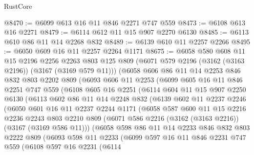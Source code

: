 \begin{lexlean}{RustCore}
\begin{coremodule}
@8470 := @6099 @613 @16 @11 @846 @2271 @747 @559
@8473 := @6108 @613 @16 @2271
@8479 := @6114 @612 @11 @15 @907 @2270 @6130
@8485 := @6113 @610 @86 @11 @14 @2268 @832
@8489 := @6139 @610 @11 @2257 @2266
@8495 := @6050 @609 @16 @11 @2257 @2264 @1171
@8675 := @6058
    @580
    @608
    @11
    @15
    @2196
    @2256
    @2263
    @803
    @125
    @809
    (@6071 @579 @2196 (@3162 (@3163 @2196)) (@3167 (@3169 @579 @11)))
    (@6058
      @606
      @86
      @11
      @14
      @2253
      @846
      @832
      @803
      @2202
      @809
      (@6093
        @606
        @11
        @2253
        (@6099
          @605
          @16
          @11
          @846
          @2251
          @747
          @559
          (@6108
            @605
            @16
            @2251
            (@6114
              @604
              @11
              @15
              @907
              @2250
              @6130
              (@6113
                @602
                @86
                @11
                @14
                @2248
                @832
                (@6139
                  @602
                  @11
                  @2237
                  @2246
                  (@6050
                    @601
                    @16
                    @11
                    @2237
                    @2244
                    @1171
                    (@6058
                      @587
                      @600
                      @11
                      @15
                      @2216
                      @2236
                      @2243
                      @803
                      @2210
                      @809
                      (@6071 @586 @2216 (@3162 (@3163 @2216)) (@3167 (@3169 @586 @11)))
                      (@6058
                        @598
                        @86
                        @11
                        @14
                        @2233
                        @846
                        @832
                        @803
                        @2222
                        @809
                        (@6093
                          @598
                          @11
                          @2233
                          (@6099
                            @597
                            @16
                            @11
                            @846
                            @2231
                            @747
                            @559
                            (@6108
                              @597
                              @16
                              @2231
                              (@6114

\end{coremodule}
\end{lexlean}
